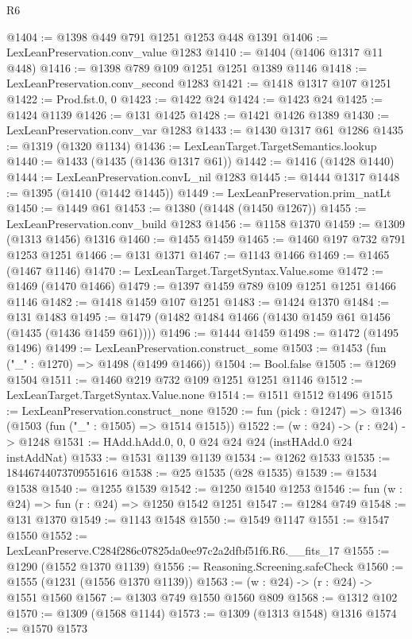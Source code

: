 \begin{lexlean}{R6}
\begin{coremodule}
@1404 := @1398 @449 @791 @1251 @1253 @448 @1391
@1406 := LexLeanPreservation.conv_value @1283
@1410 := @1404 (@1406 @1317 @11 @448)
@1416 := @1398 @789 @109 @1251 @1251 @1389 @1146
@1418 := LexLeanPreservation.conv_second @1283
@1421 := @1418 @1317 @107 @1251
@1422 := Prod.fst.{0, 0}
@1423 := @1422 @24
@1424 := @1423 @24
@1425 := @1424 @1139
@1426 := @131 @1425
@1428 := @1421 @1426 @1389
@1430 := LexLeanPreservation.conv_var @1283
@1433 := @1430 @1317 @61 @1286
@1435 := @1319 (@1320 @1134)
@1436 := LexLeanTarget.TargetSemantics.lookup
@1440 := @1433 (@1435 (@1436 @1317 @61))
@1442 := @1416 (@1428 @1440)
@1444 := LexLeanPreservation.convL_nil @1283
@1445 := @1444 @1317
@1448 := @1395 (@1410 (@1442 @1445))
@1449 := LexLeanPreservation.prim_natLt
@1450 := @1449 @61
@1453 := @1380 (@1448 (@1450 @1267))
@1455 := LexLeanPreservation.conv_build @1283
@1456 := @1158 @1370
@1459 := @1309 (@1313 @1456) @1316
@1460 := @1455 @1459
@1465 := @1460 @197 @732 @791 @1253 @1251
@1466 := @131 @1371
@1467 := @1143 @1466
@1469 := @1465 (@1467 @1146)
@1470 := LexLeanTarget.TargetSyntax.Value.some
@1472 := @1469 (@1470 @1466)
@1479 := @1397 @1459 @789 @109 @1251 @1251 @1466 @1146
@1482 := @1418 @1459 @107 @1251
@1483 := @1424 @1370
@1484 := @131 @1483
@1495 := @1479 (@1482 @1484 @1466 (@1430 @1459 @61 @1456 (@1435 (@1436 @1459 @61))))
@1496 := @1444 @1459
@1498 := @1472 (@1495 @1496)
@1499 := LexLeanPreservation.construct_some
@1503 := @1453 (fun ("_" : @1270) => @1498 (@1499 @1466))
@1504 := Bool.false
@1505 := @1269 @1504
@1511 := @1460 @219 @732 @109 @1251 @1251 @1146
@1512 := LexLeanTarget.TargetSyntax.Value.none
@1514 := @1511 @1512 @1496
@1515 := LexLeanPreservation.construct_none
@1520 := fun (pick : @1247) => @1346 (@1503 (fun ("_" : @1505) => @1514 @1515))
@1522 := (w : @24) -> (r : @24) -> @1248
@1531 := HAdd.hAdd.{0, 0, 0} @24 @24 @24 (instHAdd.{0} @24 instAddNat)
@1533 := @1531 @1139 @1139
@1534 := @1262 @1533
@1535 := 18446744073709551616
@1538 := @25 @1535 (@28 @1535)
@1539 := @1534 @1538
@1540 := @1255 @1539
@1542 := @1250 @1540 @1253
@1546 := fun (w : @24) => fun (r : @24) => @1250 @1542 @1251
@1547 := @1284 @749
@1548 := @131 @1370
@1549 := @1143 @1548
@1550 := @1549 @1147
@1551 := @1547 @1550
@1552 := LexLeanPreserve.C284f286c07825da0ee97c2a2dfbf51f6.R6.__fits_17
@1555 := @1290 (@1552 @1370 @1139)
@1556 := Reasoning.Screening.safeCheck
@1560 := @1555 (@1231 (@1556 @1370 @1139))
@1563 := (w : @24) -> (r : @24) -> @1551 @1560
@1567 := @1303 @749 @1550 @1560 @809
@1568 := @1312 @102
@1570 := @1309 (@1568 @1144)
@1573 := @1309 (@1313 @1548) @1316
@1574 := @1570 @1573

\end{coremodule}
\end{lexlean}

